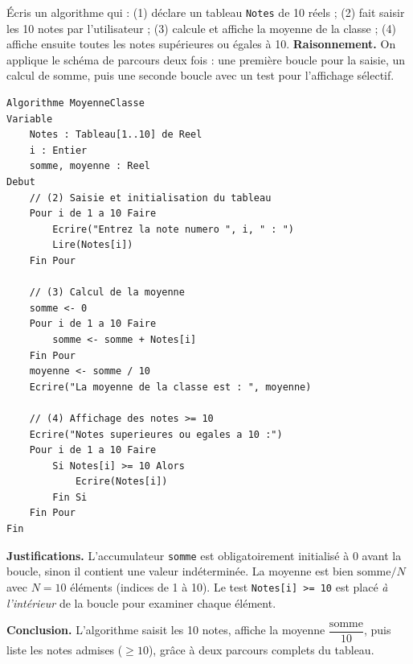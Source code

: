 \documentclass[11pt]{article}
\newcounter{popsec}
\newcounter{popsub}
\newcommand{\courssub}[1]{%
  \stepcounter{popsub}%
  \par\vspace{9pt}\noindent{\popxbold\fontsize{11.5}{13}\selectfont\color{popink}{\color{poporange}\thepopsec.\thepopsub}\hspace{6pt}#1}\par\nopagebreak\vspace{4pt}
}
\begin{document}
\begin{exoresolu}
Écris un algorithme qui : (1) déclare un tableau \texttt{Notes} de 10 réels ; (2) fait saisir les 10 notes par l'utilisateur ; (3) calcule et affiche la moyenne de la classe ; (4) affiche ensuite toutes les notes supérieures ou égales à 10.
\tcblower
\textbf{Raisonnement.} On applique le schéma de parcours deux fois : une première boucle pour la saisie, un calcul de somme, puis une seconde boucle avec un test pour l'affichage sélectif.

\begin{lstlisting}
Algorithme MoyenneClasse
Variable
    Notes : Tableau[1..10] de Reel
    i : Entier
    somme, moyenne : Reel
Debut
    // (2) Saisie et initialisation du tableau
    Pour i de 1 a 10 Faire
        Ecrire("Entrez la note numero ", i, " : ")
        Lire(Notes[i])
    Fin Pour

    // (3) Calcul de la moyenne
    somme <- 0
    Pour i de 1 a 10 Faire
        somme <- somme + Notes[i]
    Fin Pour
    moyenne <- somme / 10
    Ecrire("La moyenne de la classe est : ", moyenne)

    // (4) Affichage des notes >= 10
    Ecrire("Notes superieures ou egales a 10 :")
    Pour i de 1 a 10 Faire
        Si Notes[i] >= 10 Alors
            Ecrire(Notes[i])
        Fin Si
    Fin Pour
Fin
\end{lstlisting}

\textbf{Justifications.} L'accumulateur \texttt{somme} est obligatoirement initialisé à $0$ avant la boucle, sinon il contient une valeur indéterminée. La moyenne est bien $\text{somme}/N$ avec $N = 10$ éléments (indices de 1 à 10). Le test \texttt{Notes[i] >= 10} est placé \emph{à l'intérieur} de la boucle pour examiner chaque élément.

\textbf{Conclusion.} L'algorithme saisit les 10 notes, affiche la moyenne $\dfrac{\text{somme}}{10}$, puis liste les notes admises ($\geq 10$), grâce à deux parcours complets du tableau.
\end{exoresolu}

\courssub{Les enregistrements}
\end{document}
